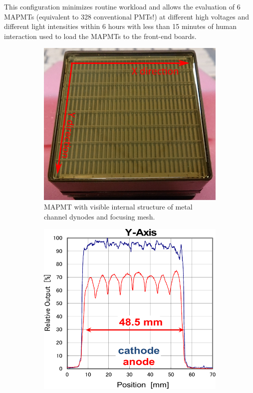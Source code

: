 This configuration minimizes routine workload and allows the evaluation of 6 MAPMTs (equivalent to 328 conventional PMTs!) at different high voltages and different light intensities within 6 hours with less than 15 minutes of human interaction used to load the MAPMTs to the front-end boards.

\begin{figure}[hbt]
	\centering
	\begin{subfigure}{0.3\linewidth}
		\includegraphics[width=\linewidth]{figures/surfaceuniform1.pdf}
		\caption{MAPMT with visible internal structure of metal channel dynodes and focusing mesh.}
		\label{fig:surfaceuniform1}
	\end{subfigure}
	\quad
	\begin{subfigure}{0.3\linewidth}
		\includegraphics[width=\linewidth]{figures/surfaceuniform3.pdf}

\end{subfigure}
\end{figure}
